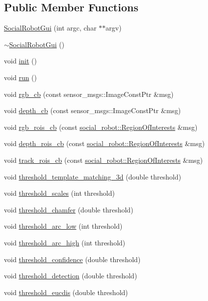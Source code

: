 \subsection*{Public Member Functions}
\begin{DoxyCompactItemize}
\item 
\hyperlink{classSocialRobotGui_a5eaed12731bfb6967d261ae8433d2110}{SocialRobotGui} (int argc, char $\ast$$\ast$argv)
\item 
\hyperlink{classSocialRobotGui_afd21dde21c5d13e302cec9edda1e9abc}{$\sim$SocialRobotGui} ()
\item 
void \hyperlink{classSocialRobotGui_a3a979f567341925976347b3c1b735347}{init} ()
\item 
void \hyperlink{classSocialRobotGui_ac9171915901ff625cfbc1492ee8f267e}{run} ()
\item 
void \hyperlink{classSocialRobotGui_adeb531e38774a69cf8411aa18d2af8e2}{rgb\_\-cb} (const sensor\_\-msgs::ImageConstPtr \&msg)
\item 
void \hyperlink{classSocialRobotGui_a20bf403e17980a1c2d9f3efaf99a0ddd}{depth\_\-cb} (const sensor\_\-msgs::ImageConstPtr \&msg)
\item 
void \hyperlink{classSocialRobotGui_aac3a124449c975e2bc69fbc71d891e16}{rgb\_\-rois\_\-cb} (const \hyperlink{structsocial__robot_1_1RegionOfInterests__}{social\_\-robot::RegionOfInterests} \&msg)
\item 
void \hyperlink{classSocialRobotGui_a0c36cf4cb20fec7ec4d79abeb04b140d}{depth\_\-rois\_\-cb} (const \hyperlink{structsocial__robot_1_1RegionOfInterests__}{social\_\-robot::RegionOfInterests} \&msg)
\item 
void \hyperlink{classSocialRobotGui_a3333bd4377889eb97216ebfbb10f8104}{track\_\-rois\_\-cb} (const \hyperlink{structsocial__robot_1_1RegionOfInterests__}{social\_\-robot::RegionOfInterests} \&msg)
\item 
void \hyperlink{classSocialRobotGui_a77d605da08f98863b272ccef00b42666}{threshold\_\-template\_\-matching\_\-3d} (double threshold)
\item 
void \hyperlink{classSocialRobotGui_a5f6fedb5046ca5cc46c021cca4778385}{threshold\_\-scales} (int threshold)
\item 
void \hyperlink{classSocialRobotGui_a35d2e5e74b8e201cb269e8dd3c1b8dab}{threshold\_\-chamfer} (double threshold)
\item 
void \hyperlink{classSocialRobotGui_acdabf6f9c428cca8e0c0b74bd9035b82}{threshold\_\-arc\_\-low} (int threshold)
\item 
void \hyperlink{classSocialRobotGui_a5108ee2ec82ffc7561421e5c8576cef4}{threshold\_\-arc\_\-high} (int threshold)
\item 
void \hyperlink{classSocialRobotGui_a2345763f68b3da1cff958a9a24218da6}{threshold\_\-confidence} (double threshold)
\item 
void \hyperlink{classSocialRobotGui_a9931a08dd5eda16aa454d6edccdfb015}{threshold\_\-detection} (double threshold)
\item 
void \hyperlink{classSocialRobotGui_ac701acad18c8d5d0358886765ba8abb9}{threshold\_\-eucdis} (double threshold)
\end{DoxyCompactItemize}
